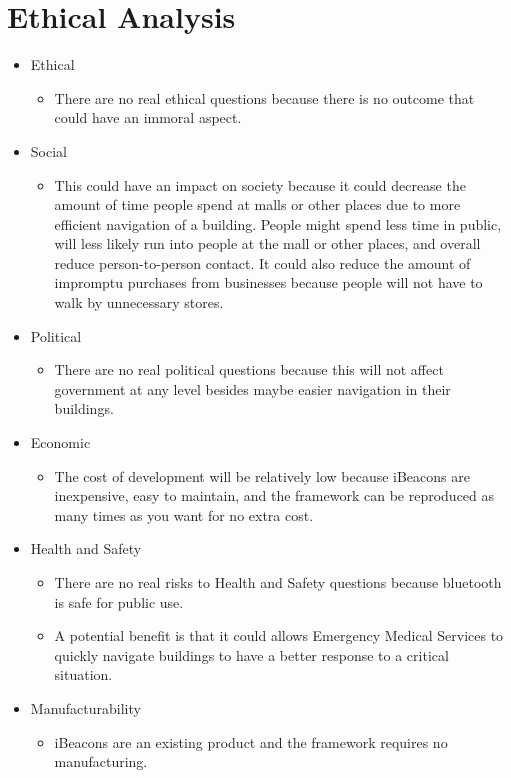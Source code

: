 \chapter{Ethical Analysis}
\begin{itemize}
\item Ethical
\begin{itemize}
\item There are no real ethical questions because there is no outcome that could have an immoral aspect.
\end{itemize}
\item Social
\begin{itemize}
\item This could have an impact on society because it could decrease the amount of time people spend at malls or other places due to more efficient navigation of a building. People might spend less time in public, will less likely run into people at the mall or other places, and overall reduce person-to-person contact. It could also reduce the amount of impromptu purchases from businesses because people will not have to walk by unnecessary stores.
\end{itemize}
\item Political
\begin{itemize}
\item There are no real political questions because this will not affect government at any level besides maybe easier navigation in their buildings.
\end{itemize}
\item Economic
\begin{itemize}
\item The cost of development will be relatively low because iBeacons are inexpensive, easy to maintain, and the framework can be reproduced as many times as you want for no extra cost.
\end{itemize}
\item Health and Safety
\begin{itemize}
\item There are no real risks to Health and Safety questions because bluetooth is safe for public use.
\item A potential benefit is that it could allows Emergency Medical Services to quickly navigate buildings to have a better response to a critical situation.
\end{itemize}
\item Manufacturability
\begin{itemize}
\item iBeacons are an existing product and the framework requires no manufacturing.

\end{itemize}
\end{itemize}
